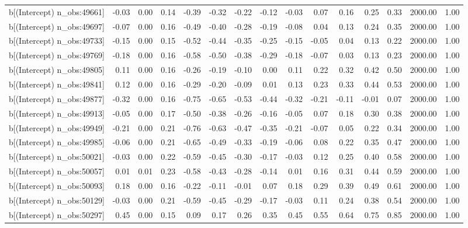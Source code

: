 \begin{table}[ht]
\begin{tabular}{rrrrrrrrrrrrrrr}
  b[(Intercept) n\_obs:49661] & -0.03 & 0.00 & 0.14 & -0.39 & -0.32 & -0.22 & -0.12 & -0.03 & 0.07 & 0.16 & 0.25 & 0.33 & 2000.00 & 1.00 \\ 
  b[(Intercept) n\_obs:49697] & -0.07 & 0.00 & 0.16 & -0.49 & -0.40 & -0.28 & -0.19 & -0.08 & 0.04 & 0.13 & 0.24 & 0.35 & 2000.00 & 1.00 \\ 
  b[(Intercept) n\_obs:49733] & -0.15 & 0.00 & 0.15 & -0.52 & -0.44 & -0.35 & -0.25 & -0.15 & -0.05 & 0.04 & 0.13 & 0.22 & 2000.00 & 1.00 \\ 
  b[(Intercept) n\_obs:49769] & -0.18 & 0.00 & 0.16 & -0.58 & -0.50 & -0.38 & -0.29 & -0.18 & -0.07 & 0.03 & 0.13 & 0.23 & 2000.00 & 1.00 \\ 
  b[(Intercept) n\_obs:49805] & 0.11 & 0.00 & 0.16 & -0.26 & -0.19 & -0.10 & 0.00 & 0.11 & 0.22 & 0.32 & 0.42 & 0.50 & 2000.00 & 1.00 \\ 
  b[(Intercept) n\_obs:49841] & 0.12 & 0.00 & 0.16 & -0.29 & -0.20 & -0.09 & 0.01 & 0.13 & 0.23 & 0.33 & 0.44 & 0.53 & 2000.00 & 1.00 \\ 
  b[(Intercept) n\_obs:49877] & -0.32 & 0.00 & 0.16 & -0.75 & -0.65 & -0.53 & -0.44 & -0.32 & -0.21 & -0.11 & -0.01 & 0.07 & 2000.00 & 1.00 \\ 
  b[(Intercept) n\_obs:49913] & -0.05 & 0.00 & 0.17 & -0.50 & -0.38 & -0.26 & -0.16 & -0.05 & 0.07 & 0.18 & 0.30 & 0.38 & 2000.00 & 1.00 \\ 
  b[(Intercept) n\_obs:49949] & -0.21 & 0.00 & 0.21 & -0.76 & -0.63 & -0.47 & -0.35 & -0.21 & -0.07 & 0.05 & 0.22 & 0.34 & 2000.00 & 1.00 \\ 
  b[(Intercept) n\_obs:49985] & -0.06 & 0.00 & 0.21 & -0.65 & -0.49 & -0.33 & -0.19 & -0.06 & 0.08 & 0.22 & 0.35 & 0.47 & 2000.00 & 1.00 \\ 
  b[(Intercept) n\_obs:50021] & -0.03 & 0.00 & 0.22 & -0.59 & -0.45 & -0.30 & -0.17 & -0.03 & 0.12 & 0.25 & 0.40 & 0.58 & 2000.00 & 1.00 \\ 
  b[(Intercept) n\_obs:50057] & 0.01 & 0.01 & 0.23 & -0.58 & -0.43 & -0.28 & -0.14 & 0.01 & 0.16 & 0.31 & 0.44 & 0.59 & 2000.00 & 1.00 \\ 
  b[(Intercept) n\_obs:50093] & 0.18 & 0.00 & 0.16 & -0.22 & -0.11 & -0.01 & 0.07 & 0.18 & 0.29 & 0.39 & 0.49 & 0.61 & 2000.00 & 1.00 \\ 
  b[(Intercept) n\_obs:50129] & -0.03 & 0.00 & 0.21 & -0.59 & -0.45 & -0.29 & -0.17 & -0.03 & 0.11 & 0.24 & 0.38 & 0.54 & 2000.00 & 1.00 \\ 
  b[(Intercept) n\_obs:50297] & 0.45 & 0.00 & 0.15 & 0.09 & 0.17 & 0.26 & 0.35 & 0.45 & 0.55 & 0.64 & 0.75 & 0.85 & 2000.00 & 1.00 \\ 

\end{tabular}
\end{table}
